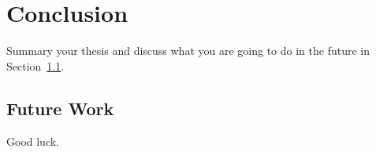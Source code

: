 \chapter{Conclusion}
\label{cha:conc}
Summary your thesis and discuss what you are going to do in the future in Section~\ref{sec:future}.


\section{Future Work}
\label{sec:future}
Good luck.



